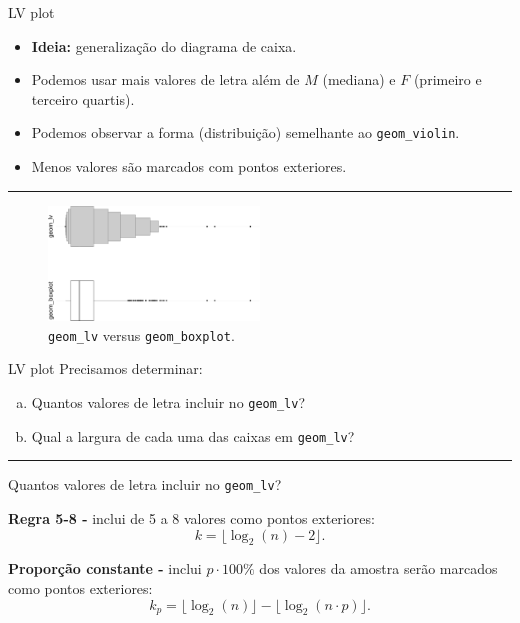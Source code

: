 \documentclass[
  10pt,
  ignorenonframetext,
]{beamer}
\providecommand{\tightlist}{%
  \setlength{\itemsep}{0pt}\setlength{\parskip}{0pt}}\usepackage{longtable,booktabs,array}
\newcommand*{\destaque}[1]{%
    \colorbox{cabecalho}{\textcolor{titulo}{#1}}
}
\newcommand*{\regrafina}{\rule{\textwidth}{0.5pt}}
\begin{document}
\begin{frame}[fragile]{LV plot}
\protect\hypertarget{lv-plot-1}{}
\begin{itemize}
\tightlist
\item
  \textbf{Ideia:} generalização do diagrama de caixa.
\item
  Podemos usar mais valores de letra além de \(M\) (mediana) e \(F\)
  (primeiro e terceiro quartis).
\item
  Podemos observar a forma (distribuição) semelhante ao
  \texttt{geom\_violin}.
\item
  Menos valores são marcados com pontos exteriores.
\end{itemize}

\regrafina

\begin{figure}

{\centering \includegraphics[width=0.5\textwidth,height=\textheight]{exploracao-visualizacao_files/figure-beamer/unnamed-chunk-115-1.pdf}

}

\caption{\texttt{geom\_lv} versus \texttt{geom\_boxplot}.}

\end{figure}
\end{frame}

\begin{frame}[fragile]{LV plot}
\protect\hypertarget{lv-plot-2}{}
Precisamos determinar:

\begin{enumerate}
[a.]
\tightlist
\item
  Quantos valores de letra incluir no \texttt{geom\_lv}?
\item
  Qual a largura de cada uma das caixas em \texttt{geom\_lv}?
\end{enumerate}

\regrafina

\destaque{Quantos valores de letra incluir no \texttt{geom\_lv}?}

\textbf{Regra 5-8 -} inclui de 5 a 8 valores como pontos exteriores:
\[k = \lfloor \log_2(n) -2 \rfloor.\]

\textbf{Proporção constante -} inclui \(p\cdot 100\%\) dos valores da
amostra serão marcados como pontos exteriores:
\[k_p = \lfloor \log_2(n) \rfloor - \lfloor \log_2(n \cdot p) \rfloor.\]
\end{frame}
\end{document}
